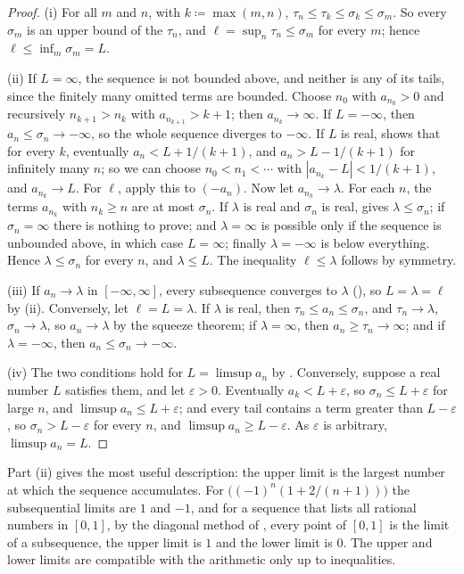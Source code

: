 \begin{proof}
(i) For all $m$ and $n$, with $k\coloneqq\max(m,n)$, $\tau_n\le\tau_k\le\sigma_k\le\sigma_m$. So every $\sigma_m$ is an upper bound of the $\tau_n$, and $\ell=\sup_n\tau_n\le\sigma_m$ for every $m$; hence $\ell\le\inf_m\sigma_m=L$.

(ii) If $L=\infty$, the sequence is not bounded above, and neither is any of its tails, since the finitely many omitted terms are bounded. Choose $n_0$ with $a_{n_0}>0$ and recursively $n_{k+1}>n_k$ with $a_{n_{k+1}}>k+1$; then $a_{n_k}\to\infty$. If $L=-\infty$, then $a_n\le\sigma_n\to-\infty$, so the whole sequence diverges to $-\infty$. If $L$ is real,  shows that for every $k$, eventually $a_n<L+1/(k+1)$, and $a_n>L-1/(k+1)$ for infinitely many $n$; so we can choose $n_0<n_1<\cdots$ with $|a_{n_k}-L|<1/(k+1)$, and $a_{n_k}\to L$. For $\ell$, apply this to $(-a_n)$. Now let $a_{n_k}\to\lambda$. For each $n$, the terms $a_{n_k}$ with $n_k\ge n$ are at most $\sigma_n$. If $\lambda$ is real and $\sigma_n$ is real,  gives $\lambda\le\sigma_n$; if $\sigma_n=\infty$ there is nothing to prove; and $\lambda=\infty$ is possible only if the sequence is unbounded above, in which case $L=\infty$; finally $\lambda=-\infty$ is below everything. Hence $\lambda\le\sigma_n$ for every $n$, and $\lambda\le L$. The inequality $\ell\le\lambda$ follows by symmetry.

(iii) If $a_n\to\lambda$ in $[-\infty,\infty]$, every subsequence converges to $\lambda$ (), so $L=\lambda=\ell$ by (ii). Conversely, let $\ell=L=\lambda$. If $\lambda$ is real, then $\tau_n\le a_n\le\sigma_n$, and $\tau_n\to\lambda$, $\sigma_n\to\lambda$, so $a_n\to\lambda$ by the squeeze theorem; if $\lambda=\infty$, then $a_n\ge\tau_n\to\infty$; and if $\lambda=-\infty$, then $a_n\le\sigma_n\to-\infty$.

(iv) The two conditions hold for $L=\limsup a_n$ by . Conversely, suppose a real number $L$ satisfies them, and let $\varepsilon>0$. Eventually $a_k<L+\varepsilon$, so $\sigma_n\le L+\varepsilon$ for large $n$, and $\limsup a_n\le L+\varepsilon$; and every tail contains a term greater than $L-\varepsilon$, so $\sigma_n>L-\varepsilon$ for every $n$, and $\limsup a_n\ge L-\varepsilon$. As $\varepsilon$ is arbitrary, $\limsup a_n=L$.
\end{proof}

Part (ii) gives the most useful description: the upper limit is the largest number at which the sequence accumulates. For $\bigl((-1)^n(1+2/(n+1))\bigr)$ the subsequential limits are $1$ and $-1$, and for a sequence that lists all rational numbers in $[0,1]$, by the diagonal method of , every point of $[0,1]$ is the limit of a subsequence, the upper limit is $1$ and the lower limit is $0$. The upper and lower limits are compatible with the arithmetic only up to inequalities.

